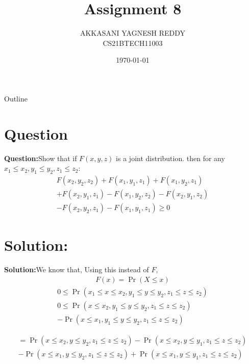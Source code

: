 \documentclass{beamer}
\title{Assignment 8}
\author{AKKASANI YAGNESH REDDY \\
     CS21BTECH11003 }
\date{\today}
\providecommand{\pr}[1]{\ensuremath{\Pr\left(#1\right)}}
\begin{document}
     \begin{frame}
     \maketitle    
     \end{frame}
     
     \logo{}
     
     \begin{frame}{Outline}
    \tableofcontents
     \end{frame}
     
     
     \section{Question}
     \begin{frame}
         \textbf{Question:}Show that if $F(x, y, z)$ is a joint distribution. then for any $x_{1}\leq x_{2},y_{1}\leq y_{2},z_{1}\leq z_{2}$:
     \begin{align}
         F(x_{2},y_{2},z_{2})+F(x_{1},y_{1},z_{1})+F(x_{1},y_{2},z_{1})\nonumber\\+F(x_{2},y_{1},z_{1})-F(x_{1},y_{2},z_{2})-F(x_{2},y_{1},z_{2})\nonumber\\-F(x_{2},y_{2},z_{1})-F(x_{1},y_{1},z_{1})\geq 0
         \end{align}
     \end{frame}
     
     \section{Solution:}\begin{frame}
       \textbf{Solution:}We know that,
    Using this instead of $F$,
     \begin{align}
        F(x)=\pr{X\leq x}
    \end{align}
  \begin{align}
0 \leq \pr{x_{1}\leq x\leq x_{2},y_{1}\leq y\leq y_{2},z_{1}\leq z\leq z_{2}}\\
0\leq\pr{x\leq x_{2},y_{1}\leq y\leq y_{2},z_{1}\leq z\leq z_{2}}\nonumber\\-\pr{x\leq x_{1},y_{1}\leq y\leq y_{2},z_{1}\leq z\leq z_{2}}
        \end{align}
          \end{frame}
          \begin{frame}
          \begin{align}
               =\pr{x\leq x_{2},y\leq y_{2},z_{1}\leq z\leq z_{2}}
        -\pr{x\leq x_{2},y\leq y_{1},z_{1}\leq z\leq z_{2}}\nonumber\\
        -\pr{x\leq x_{1},y\leq y_{2},z_{1}\leq z\leq z_{2}}
        +\pr{x\leq x_{1},y\leq y_{1},z_{1}\leq z\leq z_{2}}
           \end{align}
          \end{frame}
          
\end{document}
